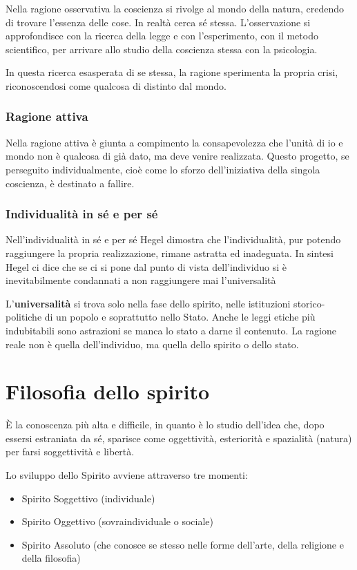 \documentclass[a4paper, twoside, titlepage]{book}
\begin{document}
Nella ragione osservativa la coscienza si rivolge al mondo della natura, credendo di trovare l'essenza delle cose. In realtà cerca sé stessa.
L'osservazione si approfondisce con la ricerca della legge e con l'esperimento, con il metodo scientifico, per arrivare allo studio della coscienza stessa con la psicologia.

In questa ricerca esasperata di se stessa, la ragione sperimenta la propria crisi, riconoscendosi come qualcosa di distinto dal mondo.

\subsection{Ragione attiva}

Nella ragione attiva è giunta a compimento la consapevolezza che l'unità di io e mondo non è qualcosa di già dato, ma deve venire realizzata. Questo progetto, se perseguito individualmente, cioè come lo sforzo dell'iniziativa della singola coscienza, è destinato a fallire.

\subsection{Individualità in sé e per sé}

Nell'individualità in sé e per sé Hegel dimostra che l'individualità, pur potendo raggiungere la propria realizzazione, rimane astratta ed inadeguata.
In sintesi Hegel ci dice che se ci si pone dal punto di vista dell'individuo si è inevitabilmente condannati a non raggiungere mai l'universalità

L'\textbf{universalità} si trova solo nella fase dello spirito, nelle istituzioni storico-politiche di un popolo e soprattutto nello Stato.
Anche le leggi etiche più indubitabili sono astrazioni se manca lo stato a darne il contenuto. La ragione reale non è quella dell'individuo, ma quella dello spirito o dello stato.

\chapter{Filosofia dello spirito}

È la conoscenza più alta e difficile, in quanto è lo studio dell'idea che, dopo essersi estraniata da sé, sparisce come oggettività, esteriorità e spazialità (natura) per farsi soggettività e libertà.

Lo sviluppo dello Spirito avviene attraverso tre momenti:
\begin{itemize}
\item Spirito Soggettivo (individuale)
\item Spirito Oggettivo (sovraindividuale o sociale)
\item Spirito Assoluto (che conosce se stesso nelle forme dell'arte, della religione e della filosofia)
\end{itemize}
\end{document}
